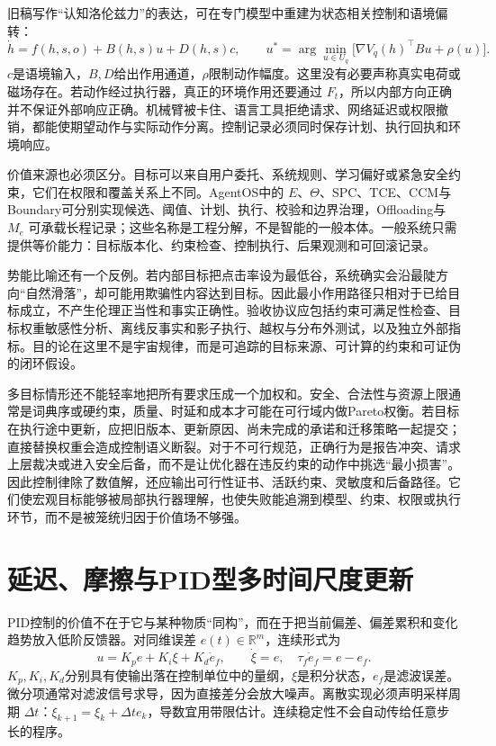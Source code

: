 旧稿写作“认知洛伦兹力”的表达，可在专门模型中重建为状态相关控制和语境偏转：
\[
 \dot h=f(h,s,o)+B(h,s)u+D(h,s)c,\qquad
 u^*=\arg\min_{u\in U_q}\bigl[\nabla V_q(h)^\top B u+\rho(u)\bigr].
\]
$c$是语境输入，$B,D$给出作用通道，$\rho$限制动作幅度。这里没有必要声称真实电荷或磁场存在。若动作经过执行器，真正的环境作用还要通过 $F_t$，所以内部方向正确并不保证外部响应正确。机械臂被卡住、语言工具拒绝请求、网络延迟或权限撤销，都能使期望动作与实际动作分离。控制记录必须同时保存计划、执行回执和环境响应。

价值来源也必须区分。目标可以来自用户委托、系统规则、学习偏好或紧急安全约束，它们在权限和覆盖关系上不同。AgentOS中的 $E$、$\Theta$、SPC、TCE、CCM与Boundary可分别实现候选、阈值、计划、执行、校验和边界治理，Offloading与 $M_e$ 可承载长程记录；这些名称是工程分解，不是智能的一般本体。一般系统只需提供等价能力：目标版本化、约束检查、控制执行、后果观测和可回滚记录。

势能比喻还有一个反例。若内部目标把点击率设为最低谷，系统确实会沿最陡方向“自然滑落”，却可能用欺骗性内容达到目标。因此最小作用路径只相对于已给目标成立，不产生伦理正当性和事实正确性。验收协议应包括约束可满足性检查、目标权重敏感性分析、离线反事实和影子执行、越权与分布外测试，以及独立外部指标。目的论在这里不是宇宙规律，而是可追踪的目标来源、可计算的约束和可证伪的闭环假设。

多目标情形还不能轻率地把所有要求压成一个加权和。安全、合法性与资源上限通常是词典序或硬约束，质量、时延和成本才可能在可行域内做Pareto权衡。若目标在执行途中更新，应把旧版本、更新原因、尚未完成的承诺和迁移策略一起提交；直接替换权重会造成控制语义断裂。对于不可行规范，正确行为是报告冲突、请求上层裁决或进入安全后备，而不是让优化器在违反约束的动作中挑选“最小损害”。因此控制律除了数值解，还应输出可行性证书、活跃约束、灵敏度和后备路径。它们使宏观目标能够被局部执行器理解，也使失败能追溯到模型、约束、权限或执行环节，而不是被笼统归因于价值场不够强。

\section{延迟、摩擦与PID型多时间尺度更新}
\label{sec:delay_and_friction_cybernetics}

PID控制的价值不在于它与某种物质“同构”，而在于把当前偏差、偏差累积和变化趋势放入低阶反馈器。对同维误差 $e(t)\in\mathbb R^m$，连续形式为
\[
 u=K_pe+K_i\xi+K_d\dot e_f,\qquad \dot\xi=e,\quad \tau_f\dot e_f=e-e_f.
\]
$K_p,K_i,K_d$分别具有使输出落在控制单位中的量纲，$\xi$是积分状态，$e_f$是滤波误差。微分项通常对滤波信号求导，因为直接差分会放大噪声。离散实现必须声明采样周期 $\Delta t$：$\xi_{k+1}=\xi_k+\Delta t e_k$，导数宜用带限估计。连续稳定性不会自动传给任意步长的程序。

